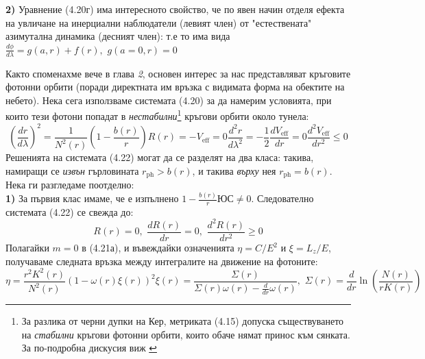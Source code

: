\noindent\textbf{2)} Уравнение (4.20г) има интересното свойство, че по явен начин отделя ефекта на увличане на инерциални наблюдатели (левият член) от "естествената"$\,$ азимутална динамика (десният член): т.е то има вида $\frac{d\phi}{d\lambda} = g(a,r) + f(r),\,\, g(a = 0, r) = 0$\newpage

Както споменахме вече в глава \emph{2}, основен интерес за нас представляват кръговите фотонни орбити (поради директната им връзка с видимата форма на обектите на небето). Нека сега използваме системата (4.20) за да намерим условията, при които тези фотони попадат в \emph{нестабилни}\footnote{За разлика от черни дупки на Кер, метриката (4.15) допуска съществуването на \emph{стабилни} кръгови фотонни орбити, които обаче нямат принос към сянката. За по-подробна дискусия виж \cite{Gyulchev2018}} кръгови орбити около тунела:
\begin{subequations}
	\begin{equation}
	\left(\frac{dr}{d\lambda}\right)^2 = \frac{1}{N^2(r)}\left(1 - \frac{b(r)}{r}\right)R(r) = - V_\text{eff} = 0
	\end{equation}
	\begin{equation}
		\frac{d^2r}{d\lambda^2} = -\frac{1}{2}\frac{dV_{\text{eff}}}{dr} = 0
	\end{equation}
	\begin{equation}
		\frac{d^2V_\text{eff}}{dr^2} \le 0
	\end{equation}
\end{subequations}
Решенията на системата (4.22) могат да се разделят на два класа: такива, намиращи се \emph{извън} гърловината $r_{\text{ph}} > b(r)$, и такива \emph{върху} нея $r_\text{ph} = b(r)$. Нека ги разгледаме поотделно:\\
	
\noindent\textbf{1)} За първия клас имаме, че е изпълнено $1 - \frac{b(r)}{r}ЮС \ne 0$. Следователно системата (4.22) се свежда до:
	\begin{equation}
		R(r) = 0,\,\, \frac{dR(r)}{dr} = 0,\,\, \frac{d^2R(r)}{dr^2} \ge 0
	\end{equation}
	Полагайки $m = 0$ в (4.21а), и въвеждайки означенията $\eta = C / E^2$ и $\xi = L_z / E$, получаваме следната връзка между интегралите на движение на фотоните:
	\begin{subequations}
		\begin{equation}
			\eta = \frac{r^2K^2(r)}{N^2(r)}\left(1 - \omega(r)\xi(r)\right)^2
		\end{equation}
		\begin{equation}
			\xi(r) = \frac{\Sigma(r)}{\Sigma(r)\omega(r) - \frac{d}{dr}\omega(r)},\,\, \Sigma(r) = \frac{d}{dr}\ln\left(\frac{N(r)}{rK(r)}\right)
		\end{equation}
	\end{subequations}

